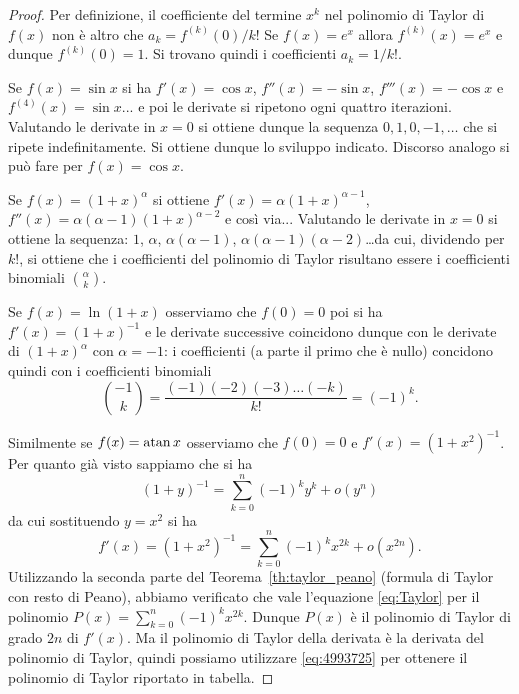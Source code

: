 %
\begin{proof}
\mymark{**}
Per definizione, il coefficiente del termine $x^k$
nel polinomio di Taylor di $f(x)$ non è altro che $a_k=f^{(k)}(0)/k!$
Se $f(x) = e^x$ allora $f^{(k)}(x) = e^x$ e dunque $f^{(k)}(0) = 1$. Si trovano quindi i coefficienti $a_k = 1/k!$.

Se $f(x) = \sin x$ si ha $f'(x)=\cos x$, $f''(x) =-\sin x$, $f'''(x) = -\cos x$ e $f^{(4)}(x) = \sin x$... e poi le derivate si ripetono ogni quattro iterazioni. Valutando le derivate in $x=0$ si ottiene dunque la sequenza $0, 1, 0, -1, \dots$ che si ripete indefinitamente. Si ottiene dunque lo sviluppo indicato. Discorso analogo si può fare per $f(x) = \cos x$.

Se $f(x) = (1+x)^\alpha$ si ottiene $f'(x) = \alpha (1+x)^{\alpha -1}$, $f''(x) = \alpha (\alpha -1) (1+x)^{\alpha -2}$ e così via...
Valutando le derivate in $x=0$ si ottiene la sequenza: $1$, $\alpha$, $\alpha(\alpha-1)$, $\alpha (\alpha-1)(\alpha -2)$\dots da cui, dividendo per $k!$, si ottiene che i coefficienti del polinomio di Taylor risultano essere i coefficienti binomiali ${\alpha \choose k}$.

Se $f(x) = \ln (1+x)$ osserviamo che $f(0)=0$ poi si ha $f'(x) = (1+x)^{-1}$ e le derivate successive coincidono dunque con le derivate di $(1+x)^\alpha$ con $\alpha=-1$: i coefficienti (a parte il primo che è nullo) concidono quindi con i coefficienti binomiali
\[
{-1 \choose k} = \frac{(-1)(-2)(-3) \dots (-k)}{k!} = (-1)^k.
\]

Similmente se $f(x) = \operatorname{atan} x$ osserviamo che $f(0) = 0$ e $f'(x) = (1+x^2)^{-1}$. Per quanto già visto sappiamo che si ha
\[
 (1+y)^{-1} = \sum_{k=0}^n (-1)^k y^k + o(y^n)
\]
da cui sostituendo $y=x^2$ si ha
\[
 f'(x) = (1+x^2)^{-1} = \sum_{k=0}^n (-1)^k x^{2k} + o(x^{2n}).
\]
Utilizzando la seconda parte del Teorema~\ref{th:taylor_peano} (formula di Taylor con resto di Peano),
abbiamo verificato che vale l'equazione \eqref{eq:Taylor}
per il polinomio $P(x) = \sum_{k=0}^n (-1)^k x^{2k}$.
Dunque $P(x)$ è il polinomio di Taylor di grado $2n$ di $f'(x)$.
Ma il polinomio di Taylor della derivata è la derivata del polinomio
di Taylor, quindi possiamo utilizzare \eqref{eq:4993725} per ottenere
il polinomio di Taylor riportato in tabella.


\end{proof}
